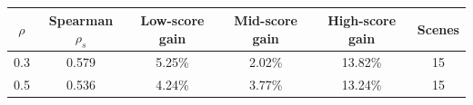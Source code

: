 \begin{tabular}{@{}c c c c c c@{}}
\toprule
$\rho$ & Spearman $\rho_s$ & Low-score gain & Mid-score gain & High-score gain & Scenes\\
\midrule
0.3 & 0.579 & 5.25\% & 2.02\% & 13.82\% & 15\\
0.5 & 0.536 & 4.24\% & 3.77\% & 13.24\% & 15\\
\bottomrule
\end{tabular}
